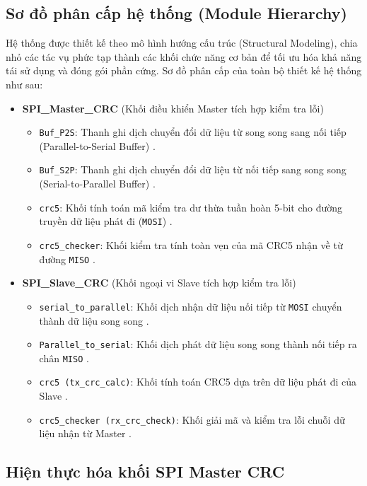 \subsection{Sơ đồ phân cấp hệ thống (Module Hierarchy)}
Hệ thống được thiết kế theo mô hình hướng cấu trúc (Structural Modeling), chia nhỏ các tác vụ phức tạp thành các khối chức năng cơ bản để tối ưu hóa khả năng tái sử dụng và đóng gói phần cứng. Sơ đồ phân cấp của toàn bộ thiết kế hệ thống như sau:
\begin{itemize}
    \item \textbf{SPI\_Master\_CRC} (Khối điều khiển Master tích hợp kiểm tra lỗi) 
    \begin{itemize}
        \item \texttt{Buf\_P2S}: Thanh ghi dịch chuyển đổi dữ liệu từ song song sang nối tiếp (Parallel-to-Serial Buffer) .
        \item \texttt{Buf\_S2P}: Thanh ghi dịch chuyển đổi dữ liệu từ nối tiếp sang song song (Serial-to-Parallel Buffer) .
        \item \texttt{crc5}: Khối tính toán mã kiểm tra dư thừa tuần hoàn 5-bit cho đường truyền dữ liệu phát đi (\texttt{MOSI}) .
        \item \texttt{crc5\_checker}: Khối kiểm tra tính toàn vẹn của mã CRC5 nhận về từ đường \texttt{MISO} .
    \end{itemize}
    \item \textbf{SPI\_Slave\_CRC} (Khối ngoại vi Slave tích hợp kiểm tra lỗi) 
    \begin{itemize}
        \item \texttt{serial\_to\_parallel}: Khối dịch nhận dữ liệu nối tiếp từ \texttt{MOSI} chuyển thành dữ liệu song song .
        \item \texttt{Parallel\_to\_serial}: Khối dịch phát dữ liệu song song thành nối tiếp ra chân \texttt{MISO} .
        \item \texttt{crc5 (tx\_crc\_calc)}: Khối tính toán CRC5 dựa trên dữ liệu phát đi của Slave .
        \item \texttt{crc5\_checker (rx\_crc\_check)}: Khối giải mã và kiểm tra lỗi chuỗi dữ liệu nhận từ Master .
    \end{itemize}
\end{itemize}

\subsection{Hiện thực hóa khối SPI Master CRC}

